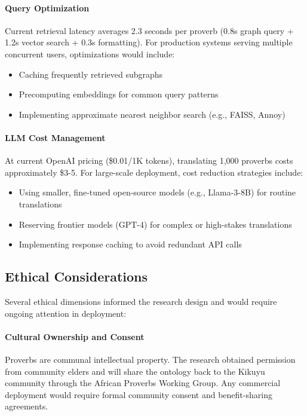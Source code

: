 \paragraph{Query Optimization} Current retrieval latency averages 2.3 seconds per proverb (0.8s graph query + 1.2s vector search + 0.3s formatting). For production systems serving multiple concurrent users, optimizations would include:
\begin{itemize}
    \item Caching frequently retrieved subgraphs
    \item Precomputing embeddings for common query patterns
    \item Implementing approximate nearest neighbor search (e.g., FAISS, Annoy)
\end{itemize}

\paragraph{LLM Cost Management} At current OpenAI pricing (\$0.01/1K tokens), translating 1,000 proverbs costs approximately \$3-5. For large-scale deployment, cost reduction strategies include:
\begin{itemize}
    \item Using smaller, fine-tuned open-source models (e.g., Llama-3-8B) for routine translations
    \item Reserving frontier models (GPT-4) for complex or high-stakes translations
    \item Implementing response caching to avoid redundant API calls
\end{itemize}

\subsection{Ethical Considerations}
\label{subsec:ethical_considerations}

Several ethical dimensions informed the research design and would require ongoing attention in deployment:

\paragraph{Cultural Ownership and Consent} Proverbs are communal intellectual property. The research obtained permission from community elders and will share the ontology back to the Kikuyu community through the African Proverbs Working Group. Any commercial deployment would require formal community consent and benefit-sharing agreements.

